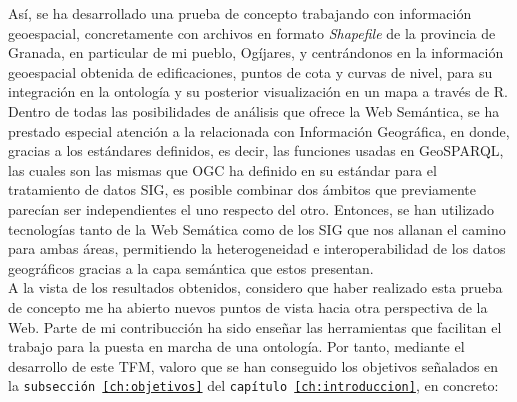 Así, se ha desarrollado una prueba de concepto trabajando con información geoespacial, concretamente con archivos en formato \textit{Shapefile} de la provincia de Granada, en particular de mi pueblo, Ogíjares, y centrándonos en la información geoespacial obtenida de edificaciones, puntos de cota y curvas de nivel, para su integración en la ontología y su posterior visualización en un mapa a través de R. Dentro de todas las posibilidades de análisis que ofrece la Web Semántica, se ha prestado especial atención a la relacionada con Información Geográfica, en donde, gracias a los estándares definidos, es decir, las funciones usadas en GeoSPARQL, las cuales son las mismas que OGC ha definido en su estándar para el tratamiento de datos SIG, es posible combinar dos ámbitos que previamente parecían ser independientes el uno respecto del otro. Entonces, se han utilizado tecnologías tanto de la Web Semática como de los SIG que nos allanan el camino para ambas áreas, permitiendo la heterogeneidad e interoperabilidad de los datos geográficos gracias a la capa semántica que estos presentan.\\


A la vista de los resultados obtenidos, considero que haber realizado esta prueba de concepto me ha abierto nuevos puntos de vista hacia otra perspectiva de la Web. Parte de mi contribucción ha sido enseñar las herramientas que facilitan el trabajo para la puesta en marcha de una ontología. Por tanto, mediante el desarrollo de este TFM, valoro que se han conseguido los objetivos señalados en la \texttt{subsección \ref{ch:objetivos}} del \texttt{capítulo \ref{ch:introduccion}}, en concreto:


